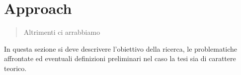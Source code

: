 \chapter{Approach}
\label{capitolo3}
\thispagestyle{empty}

\begin{quotation}
{\footnotesize
{}
\begin{flushright}
Altrimenti ci arrabbiamo
\end{flushright}
}
\end{quotation}
\vspace{0.5cm}

\noindent In questa sezione si deve descrivere l'obiettivo della ricerca, le problematiche affrontate ed eventuali definizioni preliminari nel caso la tesi sia di carattere teorico.
